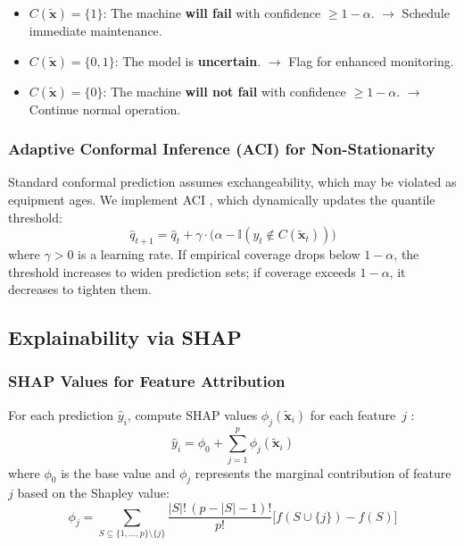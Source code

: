 \documentclass[12pt, a4paper]{article}
\begin{document}
\begin{itemize}[leftmargin=*]
    \item $C(\tilde{\mathbf{x}}) = \{1\}$: The machine \textbf{will fail} with confidence $\geq 1-\alpha$. $\to$ Schedule immediate maintenance.
    \item $C(\tilde{\mathbf{x}}) = \{0,1\}$: The model is \textbf{uncertain}. $\to$ Flag for enhanced monitoring.
    \item $C(\tilde{\mathbf{x}}) = \{0\}$: The machine \textbf{will not fail} with confidence $\geq 1-\alpha$. $\to$ Continue normal operation.
\end{itemize}

\subsubsection{Adaptive Conformal Inference (ACI) for Non-Stationarity}

Standard conformal prediction assumes exchangeability, which may be violated as equipment ages. We implement ACI \citep{gibbs2021}, which dynamically updates the quantile threshold:
\begin{equation}\label{eq:aci}
    \hat{q}_{t+1} = \hat{q}_t + \gamma\cdot\bigl(\alpha - \mathbb{I}(y_t \notin C(\tilde{\mathbf{x}}_t))\bigr)
\end{equation}
where $\gamma > 0$ is a learning rate. If empirical coverage drops below $1-\alpha$, the threshold increases to widen prediction sets; if coverage exceeds $1-\alpha$, it decreases to tighten them.

\subsection{Explainability via SHAP}

\subsubsection{SHAP Values for Feature Attribution}

For each prediction $\hat{y}_i$, compute SHAP values $\phi_j(\tilde{\mathbf{x}}_i)$ for each feature~$j$ \citep{lundberg2017}:
\begin{equation}\label{eq:shap-decomp}
    \hat{y}_i = \phi_0 + \sum_{j=1}^{p}\phi_j(\tilde{\mathbf{x}}_i)
\end{equation}
where $\phi_0$ is the base value and $\phi_j$ represents the marginal contribution of feature~$j$ based on the Shapley value:
\begin{equation}\label{eq:shapley}
    \phi_j = \sum_{S \subseteq \{1,\ldots,p\}\setminus\{j\}} \frac{|S|!\,(p-|S|-1)!}{p!}\bigl[f(S\cup\{j\}) - f(S)\bigr]
\end{equation}
\end{document}
